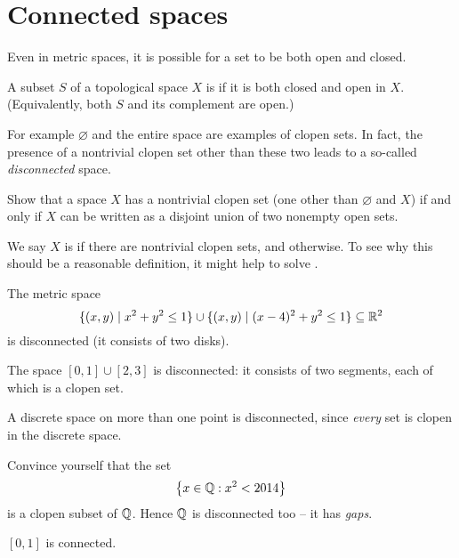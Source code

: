 \section{Connected spaces}
Even in metric spaces, it is possible for a set
to be both open and closed.
\begin{definition}
	A subset $S$ of a topological space $X$
	is  if it is both closed and open in $X$.
	(Equivalently, both $S$ and its complement are open.)
\end{definition}
For example $\varnothing$ and the entire space are examples of clopen sets.
In fact, the presence of a nontrivial clopen set other
than these two leads to a so-called \emph{disconnected} space.

\begin{ques}
	Show that a space $X$ has a nontrivial clopen set
	(one other than $\varnothing$ and $X$)
	if and only if $X$ can be written as a disjoint union
	of two nonempty open sets.
\end{ques}

We say $X$ is 
if there are nontrivial clopen sets,
and  otherwise.
To see why this should be a reasonable definition,
it might help to solve .

\begin{example}
	\listhack
	\begin{enumerate}[(a)]
		\ii The metric space 
		\[ \{ (x,y) \mid x^2+y^2\le 1 \}
			\cup \{ (x,y) \mid (x-4)^2+y^2\le1\} \subseteq \mathbb R^2 \]
		is disconnected (it consists of two disks).

		\ii The space $[0,1] \cup [2,3]$ is disconnected:
		it consists of two segments,
		each of which is a clopen set.

		\ii A discrete space on more than one point is disconnected,
		since \emph{every} set is clopen in the discrete space.

		\ii Convince yourself that the set
		\[ \left\{ x \in \mathbb Q : x^2 < 2014 \right\} \]
		is a clopen subset of $\mathbb Q$.
		Hence $\mathbb Q$ is disconnected too -- it has \emph{gaps}.

		\ii $[0,1]$ is connected.
	\end{enumerate}
\end{example}



